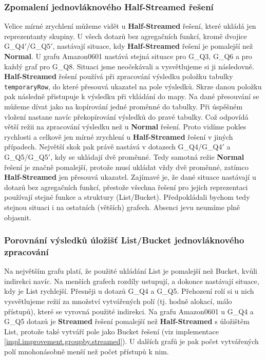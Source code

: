 \subsubsection{Zpomalení jednovláknového Half-Streamed řešení}

Velice mírné zrychlení můžeme vidět u \textbf{Half-Streamed} řešení, které ukládá jen reprezentanty skupiny.
U všech dotazů bez agregačních funkcí, kromě dvojice G\_Q4$'$/G\_Q5$'$, nastávají situace, kdy \textbf{Half-Streamed} řešení je pomalejší než \textbf{Normal}.
U grafu Amazon0601 nastává stejná situace pro G\_Q3, G\_Q6 a pro každý graf pro G\_Q8.
Situaci jsme neočekávali a vysvětlujeme si ji následovně.
\textbf{Half-Streamed} řešení používá při zpracování výsledku položku tabulky \verb+temporaryRow+, do které přesouvá ukazatel na pole výsledků.
Skrze danou položku pak následně přistupuje k výsledku při vkládání do mapy. 
Na dané přesouvání se můžeme dívat jako na kopírování jedné proměnné do tabulky.
Při úspěšném vložení nastane navíc překopírování výsledků do pravé tabulky.
Což odpovídá větší režii na zpracování výsledku než u \textbf{Normal} řešení.
Proto vidíme pokles rychlosti a celkově jen mírné zrychlení u \textbf{Half-Streamed} řešení v jiných případech.
Největší skok pak právě nastává v dotazech G\_Q4/G\_Q4$'$ a G\_Q5/G\_Q5$'$, kdy se ukládají dvě proměnné.
Tedy samotná režie \textbf{Normal} řešení je značně pomalejší, protože musí ukládat vždy dvě proměnné, zatímco \textbf{Half-Streamed} jen přesouvá ukazatel.
Zajímavé je, že dané situace nastávají u dotazů bez agregačních funkcí, přestože všechna řešení pro jejich reprezentaci používají stejné funkce a struktury (List/Bucket).
Předpokládali bychom tedy stejnou situaci i na ostatních (větších) grafech.
Absenci jevu neumíme plně objasnit.

\subsubsection{Porovnání výsledků úložišť List/Bucket jednovláknového zpracování}

Na největším grafu platí, že použité ukládání List je pomalejší než Bucket, kvůli indirekci navíc.
Na menších grafech rozdíly ustupují, a dokonce nastávají situace, kdy je List rychlejší. 
Přesněji u dotazů G\_Q4 a G\_Q5.
Přehození rolí si u nich vysvětlujeme režií za množství vytvářených polí (tj. hodně alokací, málo přístupů), které se vyrovná použité indirekci.
Na grafu Amazon0601 u G\_Q4 a G\_Q5 dotazů je \textbf{Streamed} řešení pomalejší než \textbf{Half-Streamed} s úložištěm List, protože také vytváří pole jako Bucket řešení (viz implementace \ref{impl.improvement.groupby.streamed}).
U dalších grafů je pak počet vytvářených polí mnohonásobně menší než počet přístupů k nim.

